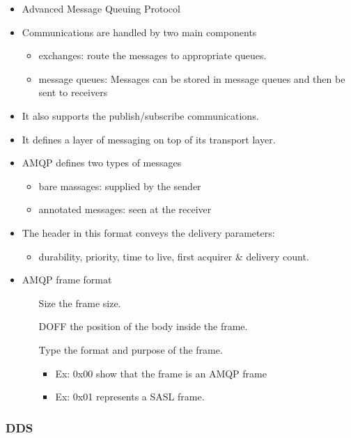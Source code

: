 \begin{itemize}
	\item Advanced Message Queuing Protocol
	\item Communications are handled by two main components
	\begin{itemize}
		\item exchanges: route the messages to appropriate queues.
		\item message queues: Messages can be stored in message queues and then be sent to receivers
	\end{itemize}
	\item It also supports the publish/subscribe communications.
	\item It defines a layer of messaging on top of its transport layer.
	\item AMQP defines two types of messages
	\begin{itemize}
		\item bare massages: supplied by the sender
		\item annotated messages: seen at the receiver
	\end{itemize}
	\item The header in this format conveys the delivery parameters:
	\begin{itemize}
		\item durability, priority, time to live, first acquirer \& delivery count.
	\end{itemize}
	\item AMQP frame format
	\begin{itemize}
		\item[Size] the frame size.
		\item[DOFF] the position of the body inside the frame.
		\item[Type] the format and purpose of the frame.
		\begin{itemize}
			\item Ex: 0x00 show that the frame is an AMQP frame
			\item Ex: 0x01 represents a SASL frame.
		\end{itemize}
	\end{itemize}
\end{itemize}

\subsubsection{DDS}

